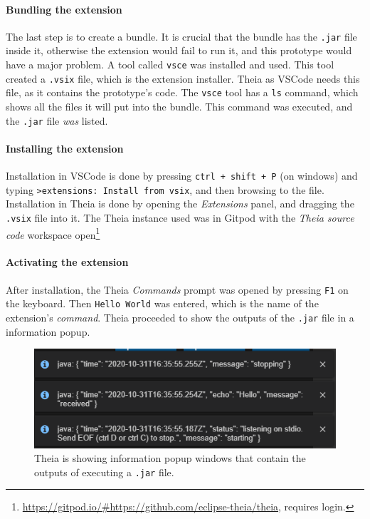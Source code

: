 \paragraph*{Bundling the extension}
The last step is to create a bundle.
It is crucial that the bundle has the \texttt{.jar} file inside it, otherwise the extension would fail to run it, and this prototype would have a major problem.
A tool called \texttt{vsce} was installed and used.
This tool created a \texttt{.vsix} file, which is the extension installer.
Theia as VSCode needs this file, as it contains the prototype's code.
The \texttt{vsce} tool has a \texttt{ls} command, which shows all the files it will put into the bundle.
This command was executed, and the \texttt{.jar} file \emph{was} listed.

\paragraph*{Installing the extension}
Installation in VSCode is done by pressing \texttt{ctrl + shift + P} (on windows) and typing \texttt{>extensions: Install from vsix}, and then browsing to the file.
Installation in Theia is done by opening the \emph{Extensions} panel, and dragging the \texttt{.vsix} file into it.
The Theia instance used was in Gitpod with the \emph{Theia source code} workspace open\footnote{\href{https://gitpod.io/\#https://github.com/eclipse-theia/theia}{https://gitpod.io/\#https://github.com/eclipse-theia/theia}, requires login.}

\paragraph*{Activating the extension}
After installation, the Theia \emph{Commands} prompt was opened by pressing \texttt{F1} on the keyboard.
Then \texttt{Hello World} was entered, which is the name of the extension's \emph{command}.
Theia proceeded to show the outputs of the \texttt{.jar} file in a information popup.

\begin{figure}[htbp]  %
  \centering
  \includegraphics[width=.5\textwidth]{figures/theia-talks-to-jar-in-vscode-extension-via-stdio}
  \caption[Theia Executes a Bundled Jar File]{Theia is showing information popup windows that contain the outputs of executing a \texttt{.jar} file.}\label{fig:prototype1-theia-jar}
\end{figure}


